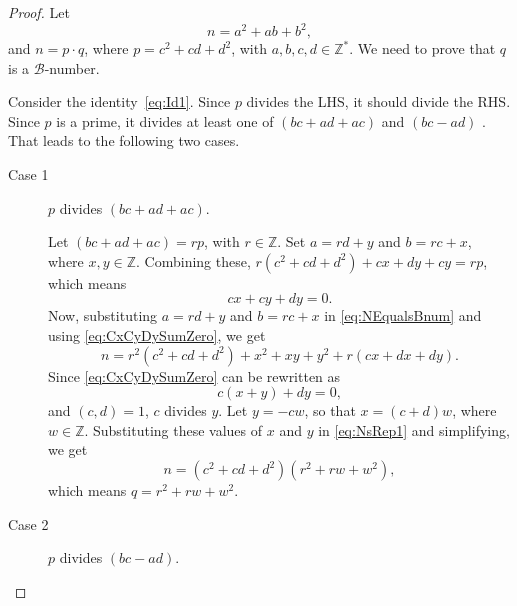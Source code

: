 \documentclass[reqno]{amsart}
\newcommand{\bnum}   {\ensuremath{\mathcal B}-number}
\newcommand{\bq}[2]{\ensuremath{{#1}^2 + {#1}{#2} + {#2}^2}}
\newcommand{\bqab}{\bq{a}{b}}
\newcommand{\bqcd}{\bq{c}{d}}
\newcommand{\bqxy}{\bq{x}{y}}
\newcommand{\Integer}{\ensuremath{\mathbb{Z}}}
\newcommand{\Nonnegative}{\ensuremath{\mathbb{Z^*}}}
\begin{document}
\begin{proof}
  Let
  \begin{equation}
    \label{eq:NEqualsBnum}
    n=\bqab,
  \end{equation}
  and $n = p \cdot q$, where $p =
  \bqcd$, with $a, b, c, d \in \Nonnegative$.  We need to prove that $q$ is a \bnum.

  Consider the identity~\eqref{eq:Id1}.
  Since $p$ divides the LHS, it should divide the RHS.  Since $p$ is a
  prime, it divides at
  least one of $(bc+ad+ac)$ and $(bc-ad)$ .  That leads
  to the following two cases.
  \begin{description}
  \item[Case 1] $p$ divides $(bc+ad+ac)$.

    Let $(bc+ad+ac) = rp$, with $r \in \Integer$.
    Set $a=rd+y$ and $b=rc+x$, where $x,y \in \Integer$. 
    Combining these, $r (\bqcd) + cx + dy + cy =
    rp$, which means
    \begin{equation}
      cx + cy + dy = 0.
      \label{eq:CxCyDySumZero}
    \end{equation}
    Now, substituting $a=rd+y$ and $b=rc+x$ in
    \eqref{eq:NEqualsBnum} and using \eqref{eq:CxCyDySumZero}, we get
    \begin{equation}
      n =  r^2(\bqcd) + \bqxy + r(cx+dx+dy).
      \label{eq:NsRep1}
    \end{equation}
    Since \eqref{eq:CxCyDySumZero} can be rewritten as
    \begin{equation*}
      c(x+y) + dy = 0,
    \end{equation*}
    and $(c,d) = 1$, $c$ divides $y$.  Let $y =
    -cw$, so that $x = (c+d)w$, where $w \in \Integer$.
    Substituting these values of $x$ and $y$ in
    \eqref{eq:NsRep1} and simplifying, we get
    \begin{equation*}
      n = (\bqcd)(\bq{r}{w}),
    \end{equation*}
    which means $q = \bq{r}{w}$.
  \item[Case 2] $p$ divides
    $(bc-ad)$.


\end{description}
\end{proof}
\end{document}
